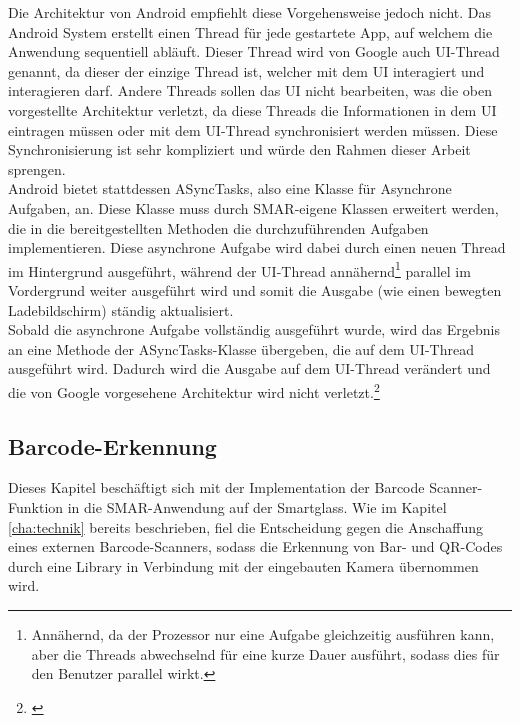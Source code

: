Die Architektur von Android empfiehlt diese Vorgehensweise jedoch nicht. Das Android System erstellt einen Thread für jede gestartete App, auf welchem die Anwendung sequentiell abläuft. Dieser Thread wird von Google auch \ac{UI}-Thread genannt, da dieser der einzige Thread ist, welcher mit dem \ac{UI} interagiert und interagieren darf. Andere Threads sollen das \ac{UI} nicht bearbeiten, was die oben vorgestellte Architektur verletzt, da diese Threads die Informationen in dem \ac{UI} eintragen müssen oder mit dem \ac{UI}-Thread synchronisiert werden müssen. Diese Synchronisierung ist sehr kompliziert und würde den Rahmen dieser Arbeit sprengen.\\

Android bietet stattdessen \glqq ASyncTasks\grqq , also eine Klasse für Asynchrone Aufgaben, an. Diese Klasse muss durch \ac{SMAR}-eigene Klassen erweitert werden, die in die bereitgestellten Methoden die durchzuführenden Aufgaben implementieren. Diese asynchrone Aufgabe wird dabei durch einen neuen Thread im Hintergrund ausgeführt, während der UI-Thread  annähernd\footnote{Annähernd, da der Prozessor nur eine Aufgabe gleichzeitig ausführen kann, aber die Threads abwechselnd für eine kurze Dauer ausführt, sodass dies für den Benutzer parallel wirkt.} parallel im Vordergrund weiter ausgeführt wird und somit die Ausgabe (wie \zB einen bewegten Ladebildschirm) ständig aktualisiert.\\
Sobald die asynchrone Aufgabe vollständig ausgeführt wurde, wird das Ergebnis an eine Methode der ASyncTasks-Klasse übergeben, die auf dem UI-Thread ausgeführt wird. Dadurch wird  die Ausgabe auf dem UI-Thread verändert und die von Google vorgesehene Architektur wird nicht verletzt.\footnote{\citep[S. 115ff.]{android_threads}}

\subsection{Barcode-Erkennung}
\label{sec:barcode}
Dieses Kapitel beschäftigt sich mit der Implementation der Barcode Scanner-Funktion in die \ac{SMAR}-Anwendung auf der Smartglass. Wie im Kapitel \ref{cha:technik}  bereits beschrieben, fiel die Entscheidung gegen die Anschaffung eines externen Barcode-Scanners, sodass die Erkennung von Bar- und QR-Codes durch eine Library in Verbindung mit der eingebauten Kamera übernommen wird.\\

